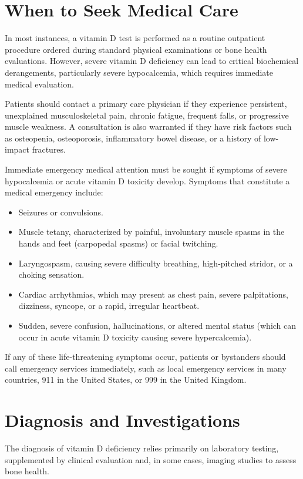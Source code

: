 \section*{When to Seek Medical Care}
In most instances, a vitamin D test is performed as a routine outpatient procedure ordered during standard physical examinations or bone health evaluations. However, severe vitamin D deficiency can lead to critical biochemical derangements, particularly severe hypocalcemia, which requires immediate medical evaluation.

Patients should contact a primary care physician if they experience persistent, unexplained musculoskeletal pain, chronic fatigue, frequent falls, or progressive muscle weakness. A consultation is also warranted if they have risk factors such as osteopenia, osteoporosis, inflammatory bowel disease, or a history of low-impact fractures.

Immediate emergency medical attention must be sought if symptoms of severe hypocalcemia or acute vitamin D toxicity develop. Symptoms that constitute a medical emergency include:
\begin{itemize}
    \item Seizures or convulsions.
    \item Muscle tetany, characterized by painful, involuntary muscle spasms in the hands and feet (carpopedal spasms) or facial twitching.
    \item Laryngospasm, causing severe difficulty breathing, high-pitched stridor, or a choking sensation.
    \item Cardiac arrhythmias, which may present as chest pain, severe palpitations, dizziness, syncope, or a rapid, irregular heartbeat.
    \item Sudden, severe confusion, hallucinations, or altered mental status (which can occur in acute vitamin D toxicity causing severe hypercalcemia).
\end{itemize}
If any of these life-threatening symptoms occur, patients or bystanders should call emergency services immediately, such as local emergency services in many countries, 911 in the United States, or 999 in the United Kingdom.

\section*{Diagnosis and Investigations}
The diagnosis of vitamin D deficiency relies primarily on laboratory testing, supplemented by clinical evaluation and, in some cases, imaging studies to assess bone health.

